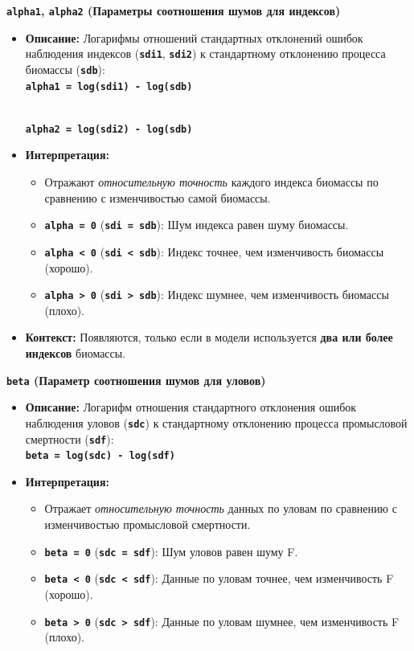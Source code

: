 \documentclass[
  letterpaper,
  DIV=11,
  numbers=noendperiod]{scrreprt}
\begin{document}
\textbf{\texttt{alpha1}, \texttt{alpha2} (Параметры соотношения шумов
для индексов)}

\begin{itemize}
\item
  \textbf{Описание:} Логарифмы отношений стандартных отклонений ошибок
  наблюдения индексов (\textbf{\texttt{sdi1}}, \textbf{\texttt{sdi2}}) к
  стандартному отклонению процесса биомассы (\textbf{\texttt{sdb}}):\\
  \textbf{\texttt{alpha1\ =\ log(sdi1)\ -\ log(sdb)}}\strut \\
  \textbf{\texttt{alpha2\ =\ log(sdi2)\ -\ log(sdb)}}
\item
  \textbf{Интерпретация:}

  \begin{itemize}
  \item
    Отражают \emph{относительную точность} каждого индекса биомассы по
    сравнению с изменчивостью самой биомассы.
  \item
    \textbf{\texttt{alpha\ =\ 0}} (\textbf{\texttt{sdi\ =\ sdb}}): Шум
    индекса равен шуму биомассы.
  \item
    \textbf{\texttt{alpha\ \textless{}\ 0}}
    (\textbf{\texttt{sdi\ \textless{}\ sdb}}): Индекс точнее, чем
    изменчивость биомассы (хорошо).
  \item
    \textbf{\texttt{alpha\ \textgreater{}\ 0}}
    (\textbf{\texttt{sdi\ \textgreater{}\ sdb}}): Индекс шумнее, чем
    изменчивость биомассы (плохо).
  \end{itemize}
\item
  \textbf{Контекст:} Появляются, только если в модели используется
  \textbf{два или более индексов} биомассы.
\end{itemize}

\textbf{\texttt{beta} (Параметр соотношения шумов для уловов)}

\begin{itemize}
\item
  \textbf{Описание:} Логарифм отношения стандартного отклонения ошибок
  наблюдения уловов (\textbf{\texttt{sdc}}) к стандартному отклонению
  процесса промысловой смертности (\textbf{\texttt{sdf}}):\\
  \textbf{\texttt{beta\ =\ log(sdc)\ -\ log(sdf)}}
\item
  \textbf{Интерпретация:}

  \begin{itemize}
  \item
    Отражает \emph{относительную точность} данных по уловам по сравнению
    с изменчивостью промысловой смертности.
  \item
    \textbf{\texttt{beta\ =\ 0}} (\textbf{\texttt{sdc\ =\ sdf}}): Шум
    уловов равен шуму F.
  \item
    \textbf{\texttt{beta\ \textless{}\ 0}}
    (\textbf{\texttt{sdc\ \textless{}\ sdf}}): Данные по уловам точнее,
    чем изменчивость F (хорошо).
  \item
    \textbf{\texttt{beta\ \textgreater{}\ 0}}
    (\textbf{\texttt{sdc\ \textgreater{}\ sdf}}): Данные по уловам
    шумнее, чем изменчивость F (плохо).
  \end{itemize}
\end{itemize}
\end{document}
